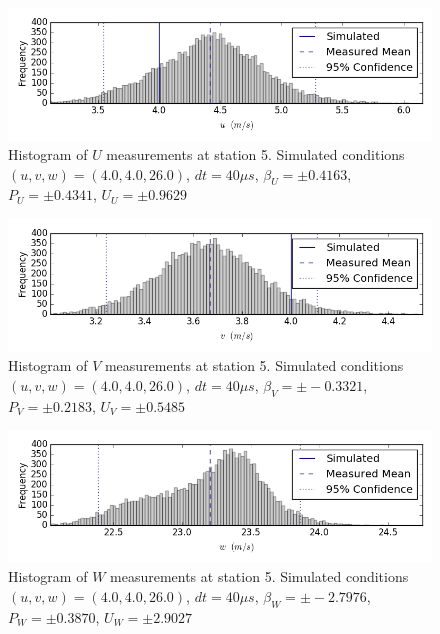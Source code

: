 \begin{figure}[H]
\centering
\includegraphics[width=6in]{figs/Ely_May28th05002/uncertainty_Ely_May28th05002_U}
\caption{Histogram of $U$ measurements at station 5. Simulated conditions $(u,v,w)=(4.0, 4.0, 26.0)$, $dt=40 \mu s$, $\beta_U=\pm 0.4163$, $P_U=\pm 0.4341$, $U_U=\pm 0.9629$}
\label{fig:uncertainty_Ely_May28th05002_U}
\end{figure}


\begin{figure}[H]
\centering
\includegraphics[width=6in]{figs/Ely_May28th05002/uncertainty_Ely_May28th05002_V}
\caption{Histogram of $V$ measurements at station 5. Simulated conditions $(u,v,w)=(4.0, 4.0, 26.0)$, $dt=40 \mu s$, $\beta_V=\pm -0.3321$, $P_V=\pm 0.2183$, $U_V=\pm 0.5485$}
\label{fig:uncertainty_Ely_May28th05002_V}
\end{figure}


\begin{figure}[H]
\centering
\includegraphics[width=6in]{figs/Ely_May28th05002/uncertainty_Ely_May28th05002_W}
\caption{Histogram of $W$ measurements at station 5. Simulated conditions $(u,v,w)=(4.0, 4.0, 26.0)$, $dt=40 \mu s$, $\beta_W=\pm -2.7976$, $P_W=\pm 0.3870$, $U_W=\pm 2.9027$}
\label{fig:uncertainty_Ely_May28th05002_W}
\end{figure}


